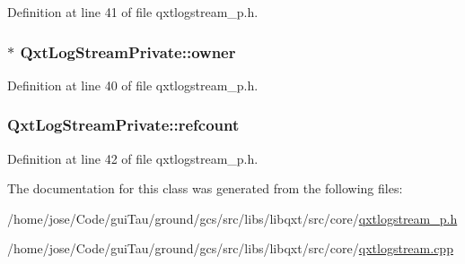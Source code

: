 Definition at line 41 of file qxtlogstream\-\_\-p.\-h.

\hypertarget{class_qxt_log_stream_private_a1c1956693c23cf09f1ffffaad135983c}{
\subsubsection[{owner}]{$\ast$ Qxt\-Log\-Stream\-Private\-::owner}}\label{class_qxt_log_stream_private_a1c1956693c23cf09f1ffffaad135983c}


Definition at line 40 of file qxtlogstream\-\_\-p.\-h.

\hypertarget{class_qxt_log_stream_private_ac3a3dc010ce0185d73b6f168776e6996}{
\subsubsection[{refcount}]{ Qxt\-Log\-Stream\-Private\-::refcount}}\label{class_qxt_log_stream_private_ac3a3dc010ce0185d73b6f168776e6996}


Definition at line 42 of file qxtlogstream\-\_\-p.\-h.



The documentation for this class was generated from the following files\-:\begin{DoxyCompactItemize}
\item 
/home/jose/\-Code/gui\-Tau/ground/gcs/src/libs/libqxt/src/core/\hyperlink{qxtlogstream__p_8h}{qxtlogstream\-\_\-p.\-h}\item 
/home/jose/\-Code/gui\-Tau/ground/gcs/src/libs/libqxt/src/core/\hyperlink{qxtlogstream_8cpp}{qxtlogstream.\-cpp}\end{DoxyCompactItemize}
